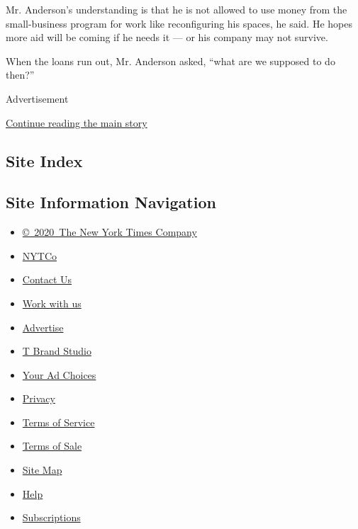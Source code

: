 Mr. Anderson's understanding is that he is not allowed to use money from
the small-business program for work like reconfiguring his spaces, he
said. He hopes more aid will be coming if he needs it --- or his company
may not survive.

When the loans run out, Mr. Anderson asked, ``what are we supposed to do
then?''

Advertisement

\protect\hyperlink{after-bottom}{Continue reading the main story}

\hypertarget{site-index}{%
\subsection{Site Index}\label{site-index}}

\hypertarget{site-information-navigation}{%
\subsection{Site Information
Navigation}\label{site-information-navigation}}

\begin{itemize}
\tightlist
\item
  \href{https://help.nytimes.com/hc/en-us/articles/115014792127-Copyright-notice}{©~2020~The
  New York Times Company}
\end{itemize}

\begin{itemize}
\tightlist
\item
  \href{https://www.nytco.com/}{NYTCo}
\item
  \href{https://help.nytimes.com/hc/en-us/articles/115015385887-Contact-Us}{Contact
  Us}
\item
  \href{https://www.nytco.com/careers/}{Work with us}
\item
  \href{https://nytmediakit.com/}{Advertise}
\item
  \href{http://www.tbrandstudio.com/}{T Brand Studio}
\item
  \href{https://www.nytimes.com/privacy/cookie-policy\#how-do-i-manage-trackers}{Your
  Ad Choices}
\item
  \href{https://www.nytimes.com/privacy}{Privacy}
\item
  \href{https://help.nytimes.com/hc/en-us/articles/115014893428-Terms-of-service}{Terms
  of Service}
\item
  \href{https://help.nytimes.com/hc/en-us/articles/115014893968-Terms-of-sale}{Terms
  of Sale}
\item
  \href{https://spiderbites.nytimes.com}{Site Map}
\item
  \href{https://help.nytimes.com/hc/en-us}{Help}
\item
  \href{https://www.nytimes.com/subscription?campaignId=37WXW}{Subscriptions}
\end{itemize}
